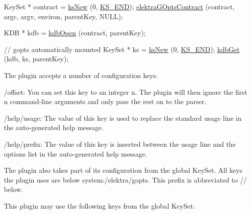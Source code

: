 \begin{DoxyCode}
KeySet * contract = \hyperlink{group__keyset_ga671e1aaee3ae9dc13b4834a4ddbd2c3c}{ksNew} (0, \hyperlink{group__keyset_ga7a28fce3773b2c873c94ac80b8b4cd54}{KS\_END});
\hyperlink{contracts_8c_af4f606fc2179e917a10c77dab576d648}{elektraGOptsContract} (contract, argc, argv, environ, parentKey, NULL);

KDB * kdb = \hyperlink{group__kdb_ga844e1299a84c3fbf1d3a905c5c893ba5}{kdbOpen} (contract, parentKey);

\textcolor{comment}{// gopts automatically mounted}
KeySet * ks = \hyperlink{group__keyset_ga671e1aaee3ae9dc13b4834a4ddbd2c3c}{ksNew} (0, \hyperlink{group__keyset_ga7a28fce3773b2c873c94ac80b8b4cd54}{KS\_END});
\hyperlink{group__kdb_ga28e385fd9cb7ccfe0b2f1ed2f62453a1}{kdbGet} (kdb, ks, parentKey);
\end{DoxyCode}


The plugin accepts a number of configuration keys.


\begin{DoxyItemize}
\item {\ttfamily /offset}\+: You can set this key to an integer {\ttfamily n}. The plugin will then ignore the first {\ttfamily n} command-\/line arguments and only pass the rest on to the parser.
\item {\ttfamily /help/usage}\+: The value of this key is used to replace the standard usage line in the auto-\/generated help message.
\item {\ttfamily /help/prefix}\+: The value of this key is inserted between the usage line and the options list in the auto-\/generated help message.
\end{DoxyItemize}

The plugin also takes part of its configuration from the global Key\+Set. All keys the plugin uses are below {\ttfamily system\+:/elektra/gopts}. This prefix is abbreviated to {\ttfamily //} below.

This plugin may use the following keys from the global Key\+Set\+:


